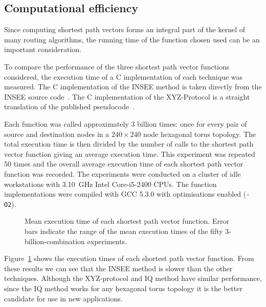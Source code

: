 		\subsection{Computational efficiency}
			
			Since computing shortest path vectors forms an integral part of the
			kernel of many routing algorithms, the running time of the function
			chosen used can be an important consideration.
			
			To compare the performance of the three shortest path vector functions
			considered, the execution time of a C implementation of each technique
			was measured. The C implementation of the INSEE method is taken directly
			from the INSEE source code~\cite{navaridas09}. The C implementation of
			the XYZ-Protocol is a straight translation of the published
			pseudocode~\cite{hoffmann15}.
			
			Each function was called approximately 3 billion times: once for every
			pair of source and destination nodes in a $240\times240$ node hexagonal
			torus topology. The total execution time is then divided by the number of
			calls to the shortest path vector function giving an average execution
			time.  This experiment was repeated 50 times and the overall average
			execution time of each shortest path vector function was recorded. The
			experiments were conducted on a cluster of idle workstations with
			3.10~GHz Intel Core-i5-2400 CPUs. The function implementations were
			compiled with GCC 5.3.0 with optimisations enabled (\verb|-O2|).
			
			\begin{figure}
				\center
				
				\caption[Mean execution time of shortest path vector functions.]%
				{Mean execution time of each shortest path vector function. Error bars
				indicate the range of the mean execution times of the fifty
				3-billion-combination experiments.}
				\label{fig:shortest-path-vector-runtimes}
			\end{figure}
			
			Figure~\ref{fig:shortest-path-vector-runtimes} shows the execution times
			of each shortest path vector function. From these results we can see that
			the INSEE method is slower than the other techniques. Although the
			XYZ-protocol and IQ method have similar performance, since the IQ method
			works for any hexagonal torus topology it is the better candidate for use
			in new applications.
	
